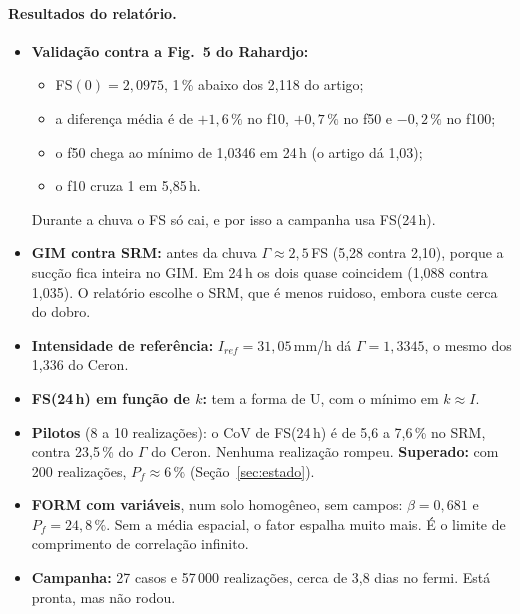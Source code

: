 \paragraph{Resultados do relatório.}
\begin{itemize}
  \item \textbf{Validação contra a Fig.\ 5 do Rahardjo:}
    \begin{itemize}
      \item FS$(0) = 2{,}0975$, 1\,\% abaixo dos 2,118 do artigo;
      \item a diferença média é de $+1{,}6\,\%$ no f10, $+0{,}7\,\%$ no f50 e $-0{,}2\,\%$ no f100;
      \item o f50 chega ao mínimo de 1,0346 em 24\,h (o artigo dá 1,03);
      \item o f10 cruza 1 em 5,85\,h.
    \end{itemize}
    Durante a chuva o FS só cai, e por isso a campanha usa FS(24\,h).
  \item \textbf{GIM contra SRM:} antes da chuva $\Gamma \approx 2{,}5\,$FS (5,28 contra 2,10), porque a sucção fica
    inteira no GIM. Em 24\,h os dois quase coincidem (1,088 contra 1,035). O relatório escolhe o SRM, que é menos
    ruidoso, embora custe cerca do dobro.
  \item \textbf{Intensidade de referência:} $I_{ref} = 31{,}05$\,mm/h dá $\Gamma = 1{,}3345$, o mesmo dos 1,336 do Ceron.
  \item \textbf{FS(24\,h) em função de $k$:} tem a forma de U, com o mínimo em $k \approx I$.
  \item \textbf{Pilotos} (8 a 10 realizações): o CoV de FS(24\,h) é de 5,6 a 7,6\,\% no SRM, contra 23,5\,\% do $\Gamma$ do
    Ceron. Nenhuma realização rompeu. \textbf{Superado:} com 200 realizações, $P_f \approx 6\,\%$
    (Seção~\ref{sec:estado}).
  \item \textbf{FORM com variáveis}, num solo homogêneo, sem campos: $\beta = 0{,}681$ e $P_f = 24{,}8\,\%$. Sem a média
    espacial, o fator espalha muito mais. É o limite de comprimento de correlação infinito.
  \item \textbf{Campanha:} 27 casos e 57\,000 realizações, cerca de 3,8 dias no fermi. Está pronta, mas não rodou.
\end{itemize}


